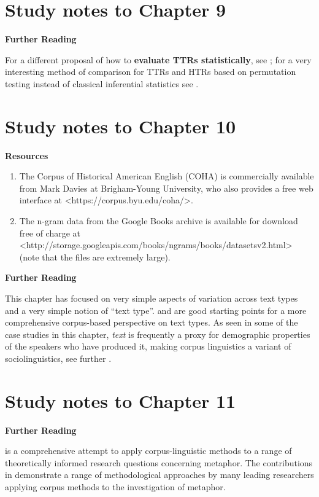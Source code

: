 \section{Study notes to Chapter 9}
\label{sec:studynotes09}

\textbf{Further Reading}

For a different proposal of how to \textbf{evaluate TTRs statistically}, see \citet[Section 6.5]{baayen_analyzing_2008}; for a very interesting method of comparison for TTRs and HTRs based on permutation testing instead of classical inferential statistics see \citet{saily_comparing_2009}.

\section{Study notes to Chapter 10}
\label{sec:studynotes10}

\textbf{Resources}

\begin{enumerate}
  \item The Corpus of Historical American English (COHA) is commercially available from Mark Davies at Brigham-Young University, who also provides a free web interface at <https://corpus.byu.edu/coha/>.
  \item The n-gram data from the Google Books archive is available for download free of charge at <http://storage.googleapis.com/books/ngrams/books/datasetsv2.html> (note that the files are extremely large).
\end{enumerate}

\textbf{Further Reading}

This chapter has focused on very simple aspects of variation across text types and a very simple notion of “text type”. \citet{biber_variation_1988} and \citet{biber_typology_1989} are good starting points for a more comprehensive corpus-based perspective on text types. As seen in some of the case studies in this chapter, \textit{text} is frequently a proxy for demographic properties of the speakers who have produced it, making corpus linguistics a variant of sociolinguistics, see further \citet{baker_sociolinguistics_2010}.

\section{Study notes to Chapter 11}
\label{sec:studynotes11}

\textbf{Further Reading}

\citet{deignan_metaphor_2005} is a comprehensive attempt to apply corpus-linguistic methods to a range of theoretically informed research questions concerning metaphor. The contributions in \citet{stefanowitsch_corpus-based_2006} demonstrate a range of methodological approaches by many leading researchers applying corpus methods to the investigation of metaphor.

